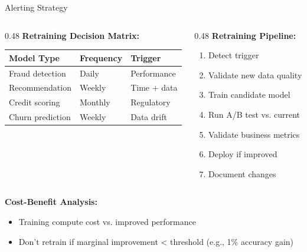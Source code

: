 \begin{frame}[fragile]{Alerting Strategy}
\vspace{0.3cm}
\begin{columns}
\begin{column}{0.48\textwidth}
\textbf{Retraining Decision Matrix:}
\begin{table}
\tiny
\begin{tabular}{p{1.5cm}p{1.2cm}p{1.2cm}}
\toprule
\textbf{Model Type} & \textbf{Frequency} & \textbf{Trigger} \\
\midrule
Fraud detection & Daily & Performance \\
Recommendation & Weekly & Time + data \\
Credit scoring & Monthly & Regulatory \\
Churn prediction & Weekly & Data drift \\
\bottomrule
\end{tabular}
\end{table}
\end{column}

\begin{column}{0.48\textwidth}
\textbf{Retraining Pipeline:}
\begin{enumerate}
\item Detect trigger
\item Validate new data quality
\item Train candidate model
\item Run A/B test vs. current
\item Validate business metrics
\item Deploy if improved
\item Document changes
\end{enumerate}
\end{column}
\end{columns}

\vspace{0.3cm}
\textbf{Cost-Benefit Analysis:}
\begin{itemize}
\item Training compute cost vs. improved performance
\item Don't retrain if marginal improvement < threshold (e.g., 1\% accuracy gain)
\end{itemize}
\end{frame}


